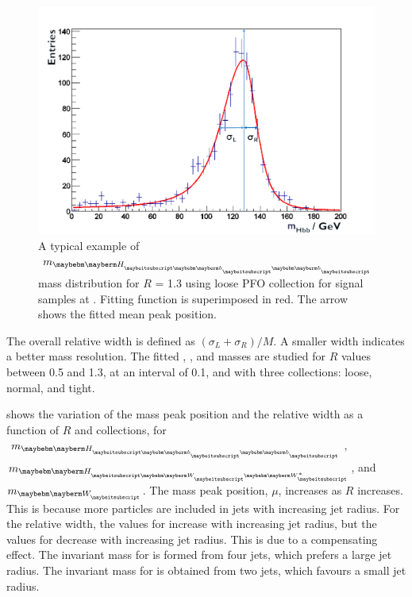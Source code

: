 \begin{figure}[!htbp]
\includegraphics[width=\largefigwidth]{doubleHiggs/MCmassFit2}
\caption[Example MC mass fit for jet optimisation in double Higgs analysis]%
   {A typical example of  $m_{\Hbb}$  mass distribution for $R$ = 1.3 using loose PFO collection for signal samples at .  Fitting function is superimposed in red. The arrow shows the fitted mean peak position. }
   \label{fig:doubleHiggsFitMCMass}
\end{figure}


The overall relative width is defined as $\left(\sigma_L  + \sigma_R\right)/M$. A smaller width indicates a  better mass resolution. The fitted \Hbb, \HWW, and \PW masses are studied for $R$ values between 0.5 and 1.3, at an interval of 0.1, and with three \PFO collections: loose, normal, and tight.


 shows the variation of the mass peak position and the relative width as a function of $R$ and \PFO collections, for $m_{\Hbb}$, $m_{\HWW}$, and $m_{\PW}$. The mass peak position, $\mu$, increases as $R$ increases. This is because more particles are included in jets with increasing jet radius. For the relative width, the values for \Hbb  increase with increasing jet radius, but the values for \HWW decrease  with increasing jet radius. This is due to a compensating effect. The invariant mass for \HWW is formed from four jets, which prefers a large jet radius. The invariant mass for \Hbb is obtained from two jets, which favours a small jet radius.

